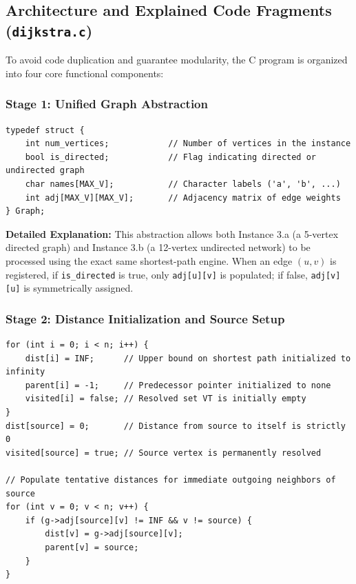 \documentclass[11pt,a4paper]{article}
\begin{document}
\subsection{Architecture and Explained Code Fragments (\texttt{dijkstra.c})}
To avoid code duplication and guarantee modularity, the C program is organized into four core functional components:

\subsubsection{Stage 1: Unified Graph Abstraction}
\begin{lstlisting}[style=cstyle, caption={Modular Graph struct supporting both directed and undirected graphs}]
typedef struct {
    int num_vertices;            // Number of vertices in the instance
    bool is_directed;            // Flag indicating directed or undirected graph
    char names[MAX_V];           // Character labels ('a', 'b', ...)
    int adj[MAX_V][MAX_V];       // Adjacency matrix of edge weights
} Graph;
\end{lstlisting}

\noindent \textbf{Detailed Explanation:}
This abstraction allows both Instance 3.a (a 5-vertex directed graph) and Instance 3.b (a 12-vertex undirected network) to be processed using the exact same shortest-path engine. When an edge $(u, v)$ is registered, if \texttt{is\_directed} is true, only \texttt{adj[u][v]} is populated; if false, \texttt{adj[v][u]} is symmetrically assigned.

\subsubsection{Stage 2: Distance Initialization and Source Setup}
\begin{lstlisting}[style=cstyle, caption={Dijkstra initialization and direct neighbor assignment}]
for (int i = 0; i < n; i++) {
    dist[i] = INF;      // Upper bound on shortest path initialized to infinity
    parent[i] = -1;     // Predecessor pointer initialized to none
    visited[i] = false; // Resolved set VT is initially empty
}
dist[source] = 0;       // Distance from source to itself is strictly 0
visited[source] = true; // Source vertex is permanently resolved

// Populate tentative distances for immediate outgoing neighbors of source
for (int v = 0; v < n; v++) {
    if (g->adj[source][v] != INF && v != source) {
        dist[v] = g->adj[source][v];
        parent[v] = source;
    }
}
\end{lstlisting}
\end{document}
